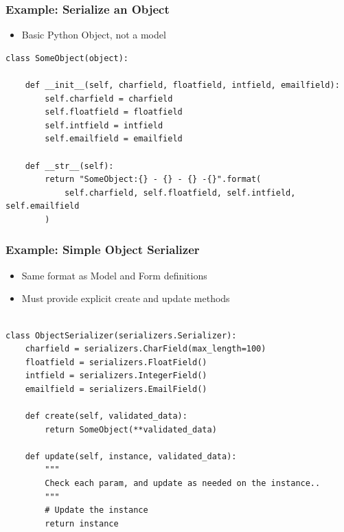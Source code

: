 \documentclass{beamer}
\begin{document}
\begin{frame}[fragile]

  \frametitle{Example: Serialize an Object}

  \begin{itemize}
  \item Basic Python Object, not a model
  \end{itemize}
  
  \begin{lstlisting}
class SomeObject(object):

    def __init__(self, charfield, floatfield, intfield, emailfield):
        self.charfield = charfield
        self.floatfield = floatfield
        self.intfield = intfield
        self.emailfield = emailfield

    def __str__(self):
        return "SomeObject:{} - {} - {} -{}".format(
            self.charfield, self.floatfield, self.intfield, self.emailfield
        )
    \end{lstlisting}

\end{frame}

\begin{frame}[fragile]

  \frametitle{Example: Simple Object Serializer}

\begin{itemize}
	\item Same format as Model and Form definitions
	\item Must provide explicit create and update methods
\end{itemize}
\begin{lstlisting}
        
class ObjectSerializer(serializers.Serializer):
    charfield = serializers.CharField(max_length=100)
    floatfield = serializers.FloatField()
    intfield = serializers.IntegerField()
    emailfield = serializers.EmailField()

    def create(self, validated_data):
        return SomeObject(**validated_data)

    def update(self, instance, validated_data):
        """
        Check each param, and update as needed on the instance..
        """
        # Update the instance
        return instance
    \end{lstlisting}

\end{frame}
\end{document}
